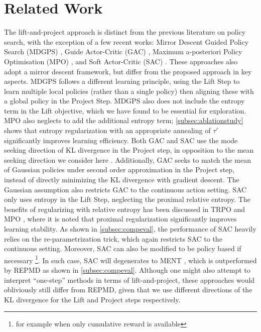 
\section{Related Work}
\label{sec:related_work}

The lift-and-project approach is distinct from the previous literature on policy
search, with the exception of a few recent works:
Mirror Descent Guided Policy Search (MDGPS) \citep{montgomery2016guided},
Guide Actor-Critic (GAC) \citep{tangkaratt2017guide},
Maximum a-posteriori Policy Optimisation (MPO) \citep{abdolmaleki2018maximum},
and Soft Actor-Critic (SAC) \citep{haarnoja2018soft}.
These approaches also adopt a mirror descent framework,
but differ from the proposed approach in key aspects.
%
MDGPS \citep{montgomery2016guided} follows a different learning principle,
using the Lift Step to learn multiple local policies 
(rather than a single policy)
then aligning these with a global policy in the Project Step.
MDGPS also does not include the entropy term in the Lift objective,
which we have found to be essential for exploration. 
%
MPO \citep{abdolmaleki2018maximum} also neglects to add the additional entropy 
term;
\cref{subsec:ablationstudy} shows that entropy regularization with an
appropriate annealing of $\tau'$ significantly improves learning efficiency.
%
Both GAC and SAC use the mode seeking direction of KL divergence in
the Project step, in opposition to the mean seeking direction
we consider here \citep{tangkaratt2017guide,haarnoja2018soft}. 
Additionally, 
GAC seeks to match the mean of Gaussian policies under second order approximation in the Project step,
instead of directly minimizing the KL divergence with gradient descent\citep{tangkaratt2017guide}.
The Gaussian assumption also restricts GAC to the continuous action setting.
SAC only uses entropy in the Lift Step, neglecting the proximal relative entropy.
The benefits of regularizing with relative entropy has been discussed in TRPO \citep{schulman2015trust} and MPO \citep{abdolmaleki2018maximum},
where it is noted that proximal regularization
significantly improves learning stability.
As shown in \cref{subsec:compeval}, the performance of SAC heavily relies on the re-parametrization trick, which again restricts SAC to the continuous setting.
Moreover, 
SAC can also be modified to be policy based  if necessary \footnote{for example when only cumulative reward is available}.
In such case, SAC will degenerates to MENT \citep{levine2018reinforcement}, which is outperformed by REPMD as shown in \cref{subsec:compeval}.
Although one might also attempt to interpret ``one-step'' methods
in terms of lift-and-project,
these approaches would obliviously still differ from REPMD,
given that we use different directions of the KL divergence
for the Lift and Project steps respectively. 

